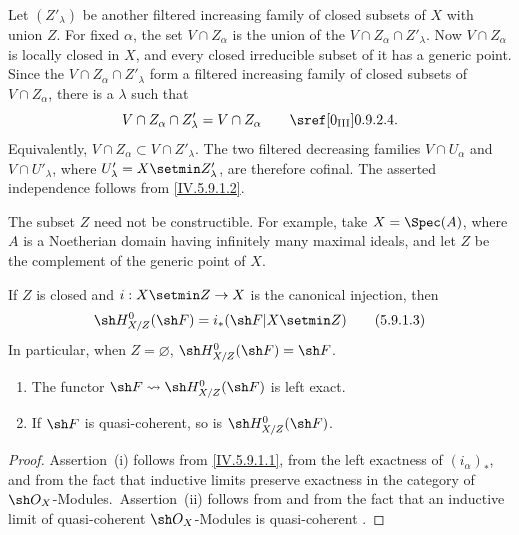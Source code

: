 Let $(Z'_\lambda)$ be another filtered increasing family of closed
subsets of $X$ with union $Z$.  For fixed $\alpha$, the set
$V\cap Z_\alpha$ is the union of the
$V\cap Z_\alpha\cap Z'_\lambda$.  Now $V\cap Z_\alpha$ is locally
closed in $X$, and every closed irreducible subset of it has a
generic point.  Since the $V\cap Z_\alpha\cap Z'_\lambda$ form a
filtered increasing family of closed subsets of $V\cap Z_\alpha$,
there is a $\lambda$ such that
\[
 V\cap Z_\alpha\cap Z'_\lambda=V\cap Z_\alpha
 \qquad\text{\sref[0\textsubscript{\mdseries III}]{0.9.2.4}}.
\]
Equivalently, $V\cap Z_\alpha\subset V\cap Z'_\lambda$.  The two
filtered decreasing families $V\cap U_\alpha$ and
$V\cap U'_\lambda$, where $U'_\lambda=X\setmin Z'_\lambda$, are therefore
cofinal.  The asserted independence follows from
\eqref{IV.5.9.1.2}.


The subset $Z$ need not be constructible.  For example, take
$X=\Spec(A)$, where $A$ is a Noetherian domain having infinitely many
maximal ideals, and let $Z$ be the complement of the generic point of
$X$.

If $Z$ is closed and $i:X\setmin Z\to X$ is the canonical injection, then
\begin{equation}
\label{IV.5.9.1.3}
 \sh H^0_{X/Z}(\sh F)=i_*(\sh F|X\setmin Z)
\tag{5.9.1.3}
\end{equation}
In particular, when $Z=\varnothing$,
$\sh H^0_{X/Z}(\sh F)=\sh F$.

\begin{proposition}[5.9.2]
\label{IV.5.9.2}
\begin{enumerate}[{\rm(i)}]
  \item\label{IV.5.9.2.i}
    The functor $\sh F\leadsto\sh H^0_{X/Z}(\sh F)$ is left exact.
  \item\label{IV.5.9.2.ii}
    If $\sh F$ is quasi-coherent, so is
    $\sh H^0_{X/Z}(\sh F)$.
\end{enumerate}
\end{proposition}

\begin{proof}
Assertion~(i) follows from \eqref{IV.5.9.1.1}, from the left
exactness of $(i_\alpha)_*$, and from the fact that inductive limits
preserve exactness in the category of $\sh O_X$-Modules.\
Assertion~(ii) follows from  and from the fact that
an inductive limit of quasi-coherent $\sh O_X$-Modules is
quasi-coherent .
\end{proof}

